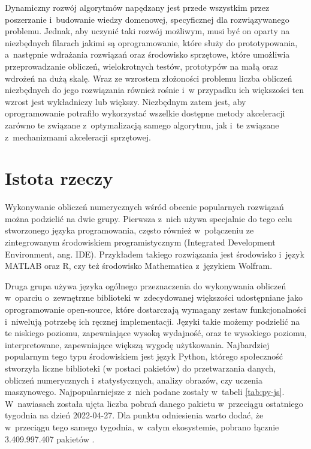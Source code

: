 Dynamiczny rozwój algorytmów napędzany jest przede wszystkim przez poszerzanie i~budowanie wiedzy domenowej, specyficznej dla rozwiązywanego problemu. Jednak, aby uczynić taki rozwój możliwym, musi być on oparty na niezbędnych filarach jakimi są oprogramowanie, które służy do prototypowania, a~następnie wdrażania rozwiązań oraz środowisko sprzętowe, które umożliwia przeprowadzanie obliczeń, wielokrotnych testów, prototypów na małą oraz wdrożeń na dużą skalę. Wraz ze wzrostem złożoności problemu liczba obliczeń niezbędnych do jego rozwiązania również rośnie i~w przypadku ich większości ten wzrost jest wykładniczy lub większy. Niezbędnym zatem jest, aby oprogramowanie potrafiło wykorzystać wszelkie dostępne metody akceleracji zarówno te związane z~optymalizacją samego algorytmu, jak i~te związane z~mechanizmami akceleracji sprzętowej.

\section{Istota rzeczy}

Wykonywanie obliczeń numerycznych wśród obecnie popularnych rozwiązań można podzielić na dwie grupy. Pierwsza z~nich używa specjalnie do tego celu stworzonego języka programowania, często również w~połączeniu ze zintegrowanym środowiskiem programistycznym (Integrated Development Environment, ang. IDE). Przykładem takiego rozwiązania jest środowisko i~język MATLAB\cite{matlab} oraz R\cite{r}, czy też środowisko Mathematica z~językiem Wolfram\cite{mathematica}.

Druga grupa używa języka ogólnego przeznaczenia do wykonywania obliczeń w~oparciu o~zewnętrzne biblioteki w~zdecydowanej większości udostępniane jako oprogramowanie open-source, które dostarczają wymagany zestaw funkcjonalności i~niwelują potrzebę ich ręcznej implementacji. Języki takie możemy podzielić na te niskiego poziomu, zapewniające wysoką wydajność, oraz te wysokiego poziomu, interpretowane, zapewniające większą wygodę użytkowania. Najbardziej popularnym tego typu środowiskiem jest język Python, którego społeczność stworzyła liczne biblioteki (w postaci pakietów) do przetwarzania danych, obliczeń numerycznych i~statystycznych, analizy obrazów, czy uczenia maszynowego. Najpopularniejsze z~nich podane zostały w~tabeli \ref{tab:py-js}. W~nawiasach została ujęta liczba pobrań danego pakietu w~przeciągu ostatniego tygodnia na dzień 2022-04-27. Dla punktu odniesienia warto dodać, że w~przeciągu tego samego tygodnia, w~całym ekosystemie, pobrano łącznie 3.409.997.407 pakietów \cite{pypi-stats}.

